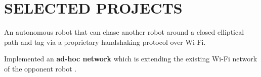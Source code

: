 \documentclass[letterpaper]{deedy-resume} %
\begin{document}
\begin{minipage}[t]{0.66\textwidth}
%

\section{SELECTED PROJECTS}



\sectionspace %

\begin{tightitemize}
\item An autonomous robot that can chase another robot around a closed elliptical path and tag via a proprietary handshaking protocol over Wi-Fi.

\item Implemented an \textbf{ad-hoc network} which is extending the existing Wi-Fi network of the opponent robot .


\end{tightitemize}
\end{minipage}
\end{document}
